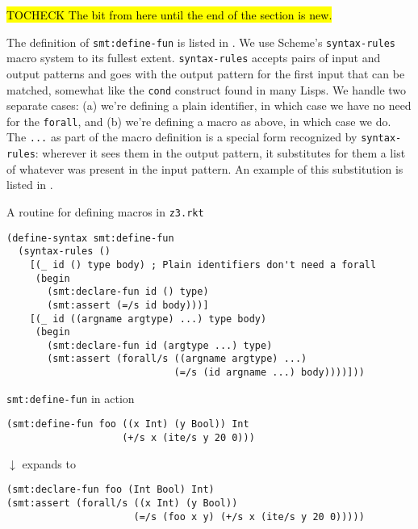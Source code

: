 \hl{TOCHECK The bit from here until the end of the section is new.}

The definition of \texttt{smt:define-fun} is listed in .
We use Scheme's \texttt{syntax-rules} macro system to its fullest extent.
\texttt{syntax-rules} accepts pairs of input and output patterns and goes with
the output pattern for the first input that can be matched, somewhat like the
\texttt{cond} construct found in many Lisps. We handle two separate cases: (a)
we're defining a plain identifier, in which case we have no need for the
\texttt{forall}, and (b) we're defining a macro as above, in which case we do.
The \texttt{...} as part of the macro definition is a special form recognized
by \texttt{syntax-rules}: wherever it sees them in the output pattern, it
substitutes for them a list of whatever was present in the input pattern. An
example of this substitution is listed in .

\begin{program}
\caption{A routine for defining macros in \texttt{z3.rkt}}
\label{fig:define-fun}
\begin{verbatim}
(define-syntax smt:define-fun
  (syntax-rules ()
    [(_ id () type body) ; Plain identifiers don't need a forall
     (begin
       (smt:declare-fun id () type)
       (smt:assert (=/s id body)))]
    [(_ id ((argname argtype) ...) type body)
     (begin
       (smt:declare-fun id (argtype ...) type)
       (smt:assert (forall/s ((argname argtype) ...)
                             (=/s (id argname ...) body))))]))
\end{verbatim}
\end{program}

\begin{program}
\caption{\texttt{smt:define-fun} in action}
\label{fig:define-fun-example}

\begin{verbatim}
(smt:define-fun foo ((x Int) (y Bool)) Int
                    (+/s x (ite/s y 20 0)))
\end{verbatim}

\begin{center}
{\large $\downarrow$} {\small expands to}
\end{center}

\begin{verbatim}
(smt:declare-fun foo (Int Bool) Int)
(smt:assert (forall/s ((x Int) (y Bool))
                      (=/s (foo x y) (+/s x (ite/s y 20 0)))))
\end{verbatim}
\end{program}


